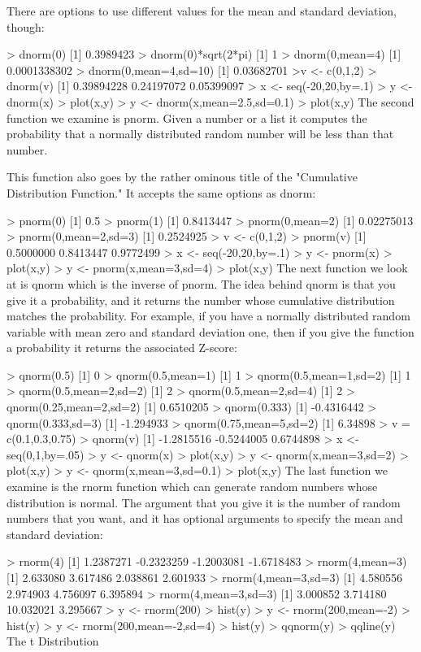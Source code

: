 \documentclass[a4paper,12pt]{article}
\begin{document}
There are options to use different values for the mean and standard deviation, though:

> dnorm(0)
[1] 0.3989423
> dnorm(0)*sqrt(2*pi)
[1] 1
> dnorm(0,mean=4)    
[1] 0.0001338302
> dnorm(0,mean=4,sd=10)
[1] 0.03682701
>v <- c(0,1,2)
> dnorm(v)
[1] 0.39894228 0.24197072 0.05399097
> x <- seq(-20,20,by=.1)
> y <- dnorm(x) 
> plot(x,y)
> y <- dnorm(x,mean=2.5,sd=0.1) 
> plot(x,y)
The second function we examine is pnorm. Given a number or a list it computes the probability that a normally distributed random number will be less than that number. 

This function also goes by the rather ominous title of the "Cumulative Distribution Function." It accepts the same options as dnorm:

> pnorm(0)
[1] 0.5
> pnorm(1)
[1] 0.8413447
> pnorm(0,mean=2)
[1] 0.02275013
> pnorm(0,mean=2,sd=3)
[1] 0.2524925
> v <- c(0,1,2)         
> pnorm(v)
[1] 0.5000000 0.8413447 0.9772499
> x <- seq(-20,20,by=.1)
> y <- pnorm(x) 
> plot(x,y)
> y <- pnorm(x,mean=3,sd=4) 
> plot(x,y)
The next function we look at is qnorm which is the inverse of pnorm. The idea behind qnorm is that you give it a probability, and it returns the number whose cumulative distribution matches the probability. For example, if you have a normally distributed random variable with mean zero and standard deviation one, then if you give the function a probability it returns the associated Z-score:

> qnorm(0.5)
[1] 0
> qnorm(0.5,mean=1)
[1] 1
> qnorm(0.5,mean=1,sd=2)
[1] 1
> qnorm(0.5,mean=2,sd=2)
[1] 2
> qnorm(0.5,mean=2,sd=4)
[1] 2
> qnorm(0.25,mean=2,sd=2)
[1] 0.6510205
> qnorm(0.333)
[1] -0.4316442
> qnorm(0.333,sd=3)
[1] -1.294933
> qnorm(0.75,mean=5,sd=2)
[1] 6.34898
> v = c(0.1,0.3,0.75)
> qnorm(v)
[1] -1.2815516 -0.5244005  0.6744898
> x <- seq(0,1,by=.05)
> y <- qnorm(x)
> plot(x,y)
> y <- qnorm(x,mean=3,sd=2)
> plot(x,y)
> y <- qnorm(x,mean=3,sd=0.1)
> plot(x,y)
The last function we examine is the rnorm function which can generate random numbers whose distribution is normal. The argument that you give it is the number of random numbers that you want, and it has optional arguments to specify the mean and standard deviation:

> rnorm(4)
[1]  1.2387271 -0.2323259 -1.2003081 -1.6718483
> rnorm(4,mean=3)
[1] 2.633080 3.617486 2.038861 2.601933
> rnorm(4,mean=3,sd=3)
[1] 4.580556 2.974903 4.756097 6.395894
> rnorm(4,mean=3,sd=3)
[1]  3.000852  3.714180 10.032021  3.295667
> y <- rnorm(200)
> hist(y)
> y <- rnorm(200,mean=-2)
> hist(y)
> y <- rnorm(200,mean=-2,sd=4)
> hist(y)
> qqnorm(y)
> qqline(y)
The t Distribution
\end{document}
